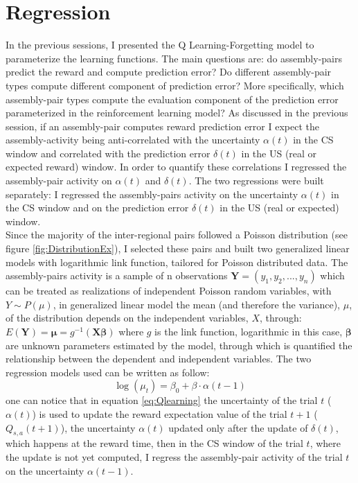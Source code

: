\section{Regression}
\label{sec:Regression}
In the previous sessions, I presented the Q Learning-Forgetting model to parameterize the learning functions. The main questions are: do assembly-pairs predict the reward and compute prediction error? Do different assembly-pair types compute different component of prediction error? More specifically, which assembly-pair types compute the evaluation component of the prediction error parameterized in the reinforcement learning model? As discussed in the previous session, if an assembly-pair computes reward prediction error I expect the assembly-activity being anti-correlated with the uncertainty $\alpha(t)$ in the CS window and correlated with the prediction error $\delta(t)$ in the US (real or expected reward) window. In order to quantify these correlations I regressed the assembly-pair activity on $\alpha (t)$ and $\delta (t)$. The two regressions were built separately: I regressed the assembly-pairs activity on the uncertainty $\alpha(t)$ in the CS window and on the prediction error $\delta(t)$ in the US (real or expected) window.\\Since the majority of the inter-regional pairs followed a Poisson distribution (see figure \ref{fig:DistributionEx}), I selected these pairs and built two generalized linear models with logarithmic link function, tailored for Poisson distributed data.
The assembly-pairs activity is a sample of n observations $\mathbf{Y}=(y_1, y_2,..., y_n)$ which can be treated as realizations of independent Poisson random variables, with $Y\sim P(\mu)$, in generalized linear model the mean (and therefore the variance), $\mu$, of the distribution depends on the independent variables, $X$, through:
$E (\mathbf {Y} )={\boldsymbol {\mu }}=g^{-1}(\mathbf {X} {\boldsymbol {\beta }})$ where $g$ is the link function, logarithmic in this case, $\boldsymbol{\beta}$ are unknown parameters estimated by the model, through which is quantified the relationship between the dependent and independent variables. The two regression models used can be written as follow:
\begin{equation}
    \log(\mu_t)=\beta_0+\beta\cdot\alpha(t-1)
    \label{eq:regrAlpha}
\end{equation}
one can notice that in equation \ref{eq:Qlearning} the uncertainty of the trial $t$ ($\alpha(t)$) is used to update the reward expectation value of the trial $t+1$ ($Q_{s,a}(t+1)$), the uncertainty $\alpha(t)$ updated only after the update of $\delta(t)$, which happens at the reward time, then in the CS window of the trial $t$, where the update is not yet computed, I regress the assembly-pair activity of the trial $t$ on the uncertainty $\alpha(t-1)$.
